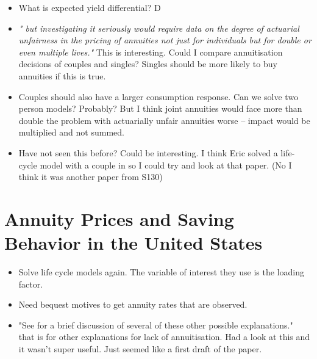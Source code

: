 \documentclass[12pt]{article}
\begin{document}
\begin{itemize}
      \item What is expected yield differential? D
      \item \textit{" but investigating it seriously would require data on the
                  degree of actuarial unfairness in the pricing of annuities not just for
                  individuals but for double or even multiple lives."} This is interesting.
            Could I compare annuitisation decisions of couples and singles? Singles
            should be more likely to buy annuities if this is true.

      \item Couples should also have a larger consumption response. Can we solve
            two person models? Probably? But I think joint annuities would face
            more than double the problem with actuarially unfair annuities worse --
            impact would be multiplied and not summed.

      \item Have not seen this before? Could be interesting. I think Eric solved a life-cycle model
            with a couple in so I could try and look at that paper. (No I think it was another paper from S130)

\end{itemize}

\section{Annuity Prices and Saving Behavior in the United States}
\begin{itemize}
      \item Solve life cycle models again. The variable of interest they use is the
            loading factor.

      \item Need bequest motives to get annuity rates that are observed.
      \item "See \cite{friedman_warshawsky_nber_1985} for a brief discussion of several
            of these other possible explanations." that is for other explanations for
            lack of annuitisation. Had a look at this and it wasn't super useful. Just
            seemed like a first draft of the paper.



\end{itemize}
\end{document}
